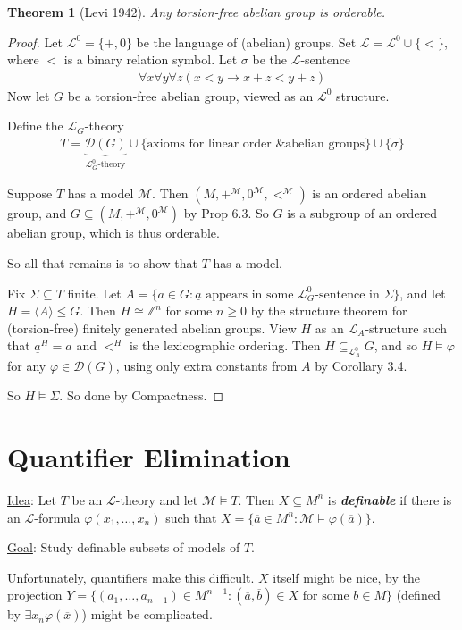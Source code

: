 \documentclass[]{article}
\theoremstyle{custhm}
\newtheorem{theorem}{Theorem}[section]
\theoremstyle{cusdef}
\theoremstyle{custhm}
\theoremstyle{custhm}
\theoremstyle{custhm}
\theoremstyle{ex}
\theoremstyle{custhm}
\theoremstyle{cusdef}
\theoremstyle{remark}
\theoremstyle{remark}
\theoremstyle{numremark}
\newcommand{\Z}{\mathbb{Z}}
\newcommand{\ra}{\rightarrow}
\newcommand{\undf}[1]{\textit{\textbf{#1}}}
\renewcommand{\L}{\mathcal{L}}
\newcommand{\M}{\mathcal{M}}
\renewcommand{\phi}{\varphi}
\renewcommand{\bar}{\overline}
\newcommand{\D}{\mathcal{D}}
\renewcommand{\subset}{\subseteq}
\begin{document}
\begin{theorem}[Levi 1942]
Any torsion-free abelian group is orderable.
\end{theorem}
\begin{proof}
Let $\L^0 = \{+,0\}$ be the language of (abelian) groups. Set $\L = \L^0 \cup\{<\}$, where $<$ is a binary relation symbol. Let $\sigma$ be the $\L$-sentence
\begin{align*}
\forall x \forall y\forall z ( x< y \ra x + z < y + z)
\end{align*}
Now let $G$ be a torsion-free abelian group, viewed as an $\L^0$ structure.

Define the $\L_G$-theory
\begin{align*}
T = \underbrace{\D(G)}_{\L_G^0\textrm{-theory}}\cup\{\textrm{axioms for linear order \& abelian groups}\}\cup\{\sigma\}
\end{align*}

Suppose $T$ has a model $\M$. Then $(M,+^\M,0^\M,<^\M)$ is an ordered abelian group, and $G\subset (M,+^\M,0^\M)$ by Prop 6.3. So $G$ is a subgroup of an ordered abelian group, which is thus orderable.

So all that remains is to show that $T$ has a model.

Fix $\Sigma \subset T$ finite. Let $A = \{a\in G: \underline{a}\textrm{ appears in some }\L_G^0\textrm{-sentence in }\Sigma\}$, and let $H = \langle A\rangle \le G$. Then $H\cong \Z^n$ for some $n\ge 0$ by the structure theorem for (torsion-free) finitely generated abelian groups. View $H$ as an $\L_A$-structure such that $\underline{a}^H = a$ and $<^H$ is the lexicographic ordering. Then $H\subset_{\L_A^0} G$, and so $H\models \phi$ for any $\phi \in \D(G)$, using only extra constants from $A$ by Corollary 3.4.

So $H\models \Sigma$. So done by Compactness.
\end{proof}


\section*{Quantifier Elimination}

\underline{Idea}: Let $T$ be an $\L$-theory and let $\M\models T$. Then $X\subset M^n$ is \undf{definable} if there is an $\L$-formula $\phi(x_1,\dots,x_n)$ such that $X = \{\bar{a}\in M^n : \M\models \phi(\bar{a})\}$.

\underline{Goal}: Study definable subsets of models of $T$.

Unfortunately, quantifiers make this difficult. $X$ itself might be nice, by the projection $Y = \{(a_1,\dots,a_{n-1})\in M^{n-1}:(\bar{a},\bar{b})\in X\textrm{ for some }b\in M\}$ (defined by $\exists x_n \phi(\bar{x})$) might be complicated.
\end{document}
